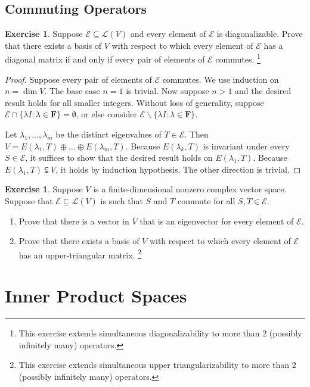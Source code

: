 \documentclass[nofonts,colorlinks]{tufte-handout}
\theoremstyle{plain} %
\theoremstyle{definition}
\newtheorem{exer}[thm]{Exercise}
\theoremstyle{remark}
\newcommand{\F}{\mathbf{F}}
\renewcommand{\L}{\mathcal{L}}
\newcommand{\E}{\mathcal{E}}
\begin{document}
\subsection{Commuting Operators}
\begin{exer}
	Suppose $\E\subseteq\L(V)$ and every element of $\E$ is diagonalizable. Prove that there exists a basis of $V$ with respect to which every element of $\E$ has a diagonal matrix if and only if every pair of elements of $\E$ commutes.%
	\footnote{This exercise extends simultaneous diagonalizability to more than $2$ (possibly infinitely many) operators.}
\end{exer}
\begin{proof}
	Suppose every pair of elements of $\E$ commutes. We use induction on $n=\dim V$. The base case $n=1$ is trivial. Now suppose $n>1$ and the desired result holds for all smaller integers. Without loss of generality, suppose $\E\cap\{\lambda I:\lambda\in\F\}=\emptyset$, or else consider $\E\backslash\{\lambda I:\lambda\in\F\}$.

	Let $\lambda_1,\dots,\lambda_m$ be the distinct eigenvalues of $T\in\E$. Then $V=E(\lambda_1,T)\oplus\dots\oplus E(\lambda_m,T)$. Because $E(\lambda_k,T)$ is invariant under every $S\in\E$, it suffices to show that the desired result holds on $E(\lambda_1,T)$. Because $E(\lambda_1,T)\subsetneqq V$, it holds by induction hypothesis. The other direction is trivial.
\end{proof}

\begin{exer}
	Suppose $V$ is a finite-dimensional nonzero complex vector space. Suppose that $\E\subseteq\L(V)$ is such that $S$ and $T$ commute for all $S,T\in\E$.
	\begin{enumerate}
		\item Prove that there is a vector in $V$ that is an eigenvector for every element of $\E$.
		\item Prove that there exists a basis of $V$ with respect to which every element of $\E$ has an upper-triangular matrix.%
		\footnote{This exercise extends simultaneous upper triangularizability to more than $2$ (possibly infinitely many) operators.}
	\end{enumerate}
\end{exer}


\section{Inner Product Spaces}
\end{document}
